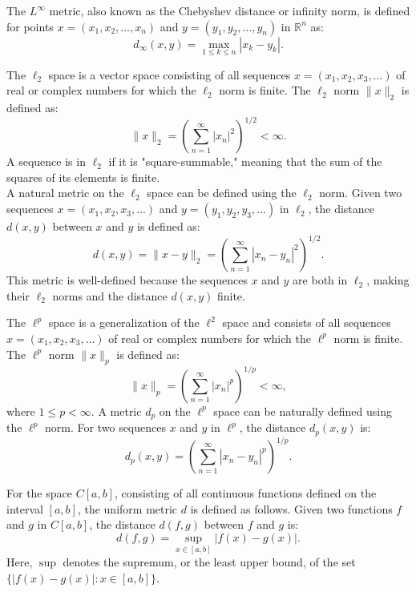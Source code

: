 \begin{example}
    The \( L^\infty \) metric, also known as the Chebyshev distance or infinity norm, is defined for points \( x = (x_1, x_2, \ldots, x_n) \) and \( y = (y_1, y_2, \ldots, y_n) \) in \( \mathbb{R}^n \) as:
    \[
    d_\infty(x, y) = \max_{1 \leq k \leq n} |x_k - y_k|.
    \]
\end{example}

\begin{definition}[$l_2$ space]
    The \( \ell_2 \) space is a vector space consisting of all sequences \( x = (x_1, x_2, x_3, \ldots) \) of real or complex numbers for which the \( \ell_2 \) norm is finite. The \( \ell_2 \) norm \( \| x \|_2 \) is defined as:
    \[
    \| x \|_2 = \left( \sum_{n=1}^{\infty} |x_n|^2 \right)^{1/2} < \infty.
    \]
    A sequence is in \( \ell_2 \) if it is "square-summable," meaning that the sum of the squares of its elements is finite. \\
    A natural metric on the \( \ell_2 \) space can be defined using the \( \ell_2 \) norm. Given two sequences \( x = (x_1, x_2, x_3, \ldots) \) and \( y = (y_1, y_2, y_3, \ldots) \) in \( \ell_2 \), the distance \( d(x, y) \) between \( x \) and \( y \) is defined as:
    \[
    d(x, y) = \| x - y \|_2 = \left( \sum_{n=1}^{\infty} |x_n - y_n|^2 \right)^{1/2}.
    \]
    This metric is well-defined because the sequences \( x \) and \( y \) are both in \( \ell_2 \), making their \( \ell_2 \) norms and the distance \( d(x, y) \) finite.
\end{definition}


\begin{definition}[$l_p$ space]
    The \( \ell^p \) space is a generalization of the \( \ell^2 \) space and consists of all sequences \( x = (x_1, x_2, x_3, \ldots) \) of real or complex numbers for which the \( \ell^p \) norm is finite. The \( \ell^p \) norm \( \| x \|_p \) is defined as:
    \[
    \| x \|_p = \left( \sum_{n=1}^{\infty} |x_n|^p \right)^{1/p} < \infty,
    \]
    where \( 1 \leq p < \infty \).
    A metric \( d_p \) on the \( \ell^p \) space can be naturally defined using the \( \ell^p \) norm. For two sequences \( x \) and \( y \) in \( \ell^p \), the distance \( d_p(x, y) \) is:
    \[
    d_p(x, y) = \left( \sum_{n=1}^{\infty} |x_n - y_n|^p \right)^{1/p}.
    \]
\end{definition}

\begin{example}
    For the space \( C[a, b] \), consisting of all continuous functions defined on the interval \( [a, b] \), the uniform metric \( d \) is defined as follows. Given two functions \( f \) and \( g \) in \( C[a, b] \), the distance \( d(f, g) \) between \( f \) and \( g \) is:
    \[
    d(f, g) = \sup_{x \in [a, b]} |f(x) - g(x)|.
    \]
    Here, \( \sup \) denotes the supremum, or the least upper bound, of the set \( \{ |f(x) - g(x)| : x \in [a, b] \} \).
\end{example}

